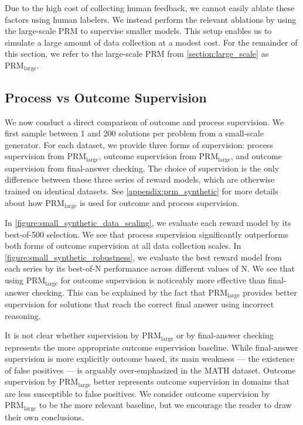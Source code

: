 Due to the high cost of collecting human feedback, we cannot easily ablate these factors using human labelers. We instead perform the relevant ablations by using the large-scale PRM to supervise smaller models. This setup enables us to simulate a large amount of data collection at a modest cost. For the remainder of this section, we refer to the large-scale PRM from \ref{section:large_scale} as $\text{PRM}_{\text{large}}$.

\subsection{Process vs Outcome Supervision}

We now conduct a direct comparison of outcome and process supervision. We first sample between 1 and 200 solutions per problem from a small-scale generator. For each dataset, we provide three forms of supervision: process supervision from $\text{PRM}_{\text{large}}$, outcome supervision from $\text{PRM}_{\text{large}}$, and outcome supervision from final-answer checking. The choice of supervision is the only difference between these three series of reward models, which are otherwise trained on identical datasets. See \ref{appendix:prm_synthetic} for more details about how $\text{PRM}_{\text{large}}$ is used for outcome and process supervision.

In \ref{figure:small_synthetic_data_scaling}, we evaluate each reward model by its best-of-500 selection. We see that process supervision significantly outperforms both forms of outcome supervision at all data collection scales. In \ref{figure:small_synthetic_robustness}, we evaluate the best reward model from each series by its best-of-N performance across different values of N. We see that using $\text{PRM}_{\text{large}}$ for outcome supervision is noticeably more effective than final-answer checking. This can be explained by the fact that $\text{PRM}_{\text{large}}$ provides better supervision for solutions that reach the correct final answer using incorrect reasoning.

It is not clear whether supervision by $\text{PRM}_{\text{large}}$ or by final-answer checking represents the more appropriate outcome supervision baseline. While final-answer supervision is more explicitly outcome based, its main weakness --- the existence of false positives --- is arguably over-emphasized in the MATH dataset. Outcome supervision by $\text{PRM}_{\text{large}}$ better represents outcome supervision in domains that are less susceptible to false positives. We consider outcome supervision by $\text{PRM}_{\text{large}}$ to be the more relevant baseline, but we encourage the reader to draw their own conclusions.

